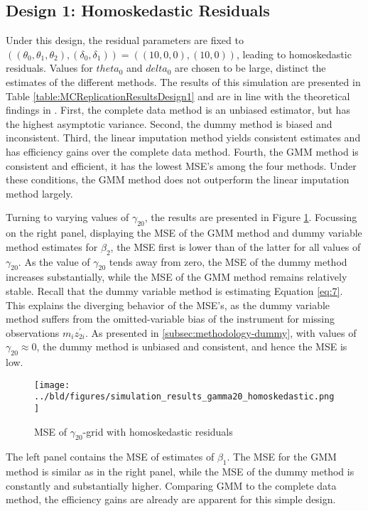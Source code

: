 \subsection{Design 1: Homoskedastic Residuals}
\label{subsec:mc-design1}
Under this design, the residual parameters are fixed to $((\theta_0, \theta_1, \theta_2), (\delta_0, \delta_1)) = ((10, 0, 0), (10, 0))$, leading to homoskedastic residuals.
Values for $theta_0$ and $delta_0$ are chosen to be large, distinct the estimates of the different methods.
The results of this simulation are presented in Table \ref{table:MCReplicationResultsDesign1} and are in line with the theoretical findings in \cite{abrevaya2017}.
First, the complete data method is an unbiased estimator, but has the highest asymptotic variance.
Second, the dummy method is biased and inconsistent.
Third, the linear imputation method yields consistent estimates and has efficiency gains over the complete data method.
Fourth, the GMM method is consistent and efficient, it has the lowest MSE's among the four methods.
Under these conditions, the GMM method does not outperform the linear imputation method largely.



Turning to varying values of $\gamma_{20}$, the results are presented in Figure \ref{fig:gamma20_homoskedastic}.
Focussing on the right panel, displaying the MSE of the GMM method and dummy variable method estimates for $\beta_2$, the MSE first is lower than of the latter for all values of $\gamma_{20}$.
As the value of $\gamma_{20}$ tends away from zero, the MSE of the dummy method increases substantially, while the MSE of the GMM method remains relatively stable.
Recall that the dummy variable method is estimating Equation \eqref{eq:7}.
This explains the diverging behavior of the MSE's, as the dummy variable method suffers from the omitted-variable bias of the instrument for missing observations $m_i z_{2i}^{\prime}$.
As presented in \ref{subsec:methodology-dummy}, with values of $\gamma_{20} \approx 0$, the dummy method is unbiased and consistent, and hence the MSE is low.

\begin{figure}[H]
    \centering
    \texttt{[image: ../bld/figures/simulation\_results\_gamma20\_homoskedastic.png]}
    \caption{MSE of $\gamma_{20}$-grid with homoskedastic residuals}
    \label{fig:gamma20_homoskedastic}
\end{figure}

The left panel contains the MSE of estimates of $\beta_1$.
The MSE for the GMM method is similar as in the right panel, while the MSE of the dummy method is constantly and substantially higher.
Comparing GMM to the complete data method, the efficiency gains are already are apparent for this simple design.


